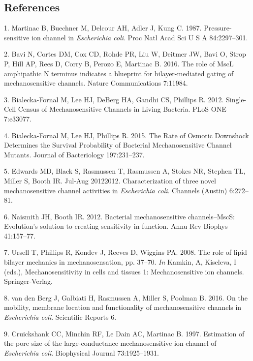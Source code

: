 \subsection*{References}\label{references}

\hypertarget{refs}{}
\hypertarget{ref-martinac1987}{}
1.
Martinac
B,
Buechner
M,
Delcour
AH,
Adler
J,
Kung
C.
1987.
Pressure-sensitive
ion
channel
in
\emph{Escherichia
coli}.
Proc
Natl
Acad
Sci U
S A
84:2297--301.

\hypertarget{ref-bavi2016}{}
2.
Bavi
N,
Cortes
DM,
Cox
CD,
Rohde
PR,
Liu W,
Deitmer
JW,
Bavi
O,
Strop
P,
Hill
AP,
Rees
D,
Corry
B,
Perozo
E,
Martinac
B.
2016.
The
role
of
MscL
amphipathic
N
terminus
indicates
a
blueprint
for
bilayer-mediated
gating
of
mechanosensitive
channels.
Nature
Communications
7:11984.

\hypertarget{ref-bialecka-fornal2012}{}
3.
Bialecka-Fornal
M, Lee
HJ,
DeBerg
HA,
Gandhi
CS,
Phillips
R.
2012.
Single-Cell
Census
of
Mechanosensitive
Channels
in
Living
Bacteria.
PLoS
ONE
7:e33077.

\hypertarget{ref-bialecka-fornal2015}{}
4.
Bialecka-Fornal
M, Lee
HJ,
Phillips
R.
2015.
The
Rate
of
Osmotic
Downshock
Determines
the
Survival
Probability
of
Bacterial
Mechanosensitive
Channel
Mutants.
Journal
of
Bacteriology
197:231--237.

\hypertarget{ref-edwards2012}{}
5.
Edwards
MD,
Black
S,
Rasmussen
T,
Rasmussen
A,
Stokes
NR,
Stephen
TL,
Miller
S,
Booth
IR.
Jul-Aug
20122012.
Characterization
of
three
novel
mechanosensitive
channel
activities
in
\emph{Escherichia
coli}.
Channels
(Austin)
6:272--81.

\hypertarget{ref-naismith2012}{}
6.
Naismith
JH,
Booth
IR.
2012.
Bacterial
mechanosensitive
channels--MscS:
Evolution's
solution
to
creating
sensitivity
in
function.
Annu
Rev
Biophys
41:157--77.

\hypertarget{ref-ursell2008}{}
7.
Ursell
T,
Phillips
R,
Kondev
J,
Reeves
D,
Wiggins
PA.
2008.
The
role
of
lipid
bilayer
mechanics
in
mechanosensation,
pp.
37--70.
\emph{In}
Kamkin,
A,
Kiseleva,
I
(eds.),
Mechanosensitivity
in
cells
and
tissues
1:
Mechanosensitive
ion
channels.
Springer-Verlag.

\hypertarget{ref-vandenberg2016}{}
8. van
den
Berg
J,
Galbiati
H,
Rasmussen
A,
Miller
S,
Poolman
B.
2016.
On the
mobility,
membrane
location
and
functionality
of
mechanosensitive
channels
in
\emph{Escherichia
coli}.
Scientific
Reports
6.

\hypertarget{ref-cruickshank1997}{}
9.
Cruickshank
CC,
Minchin
RF, Le
Dain
AC,
Martinac
B.
1997.
Estimation
of the
pore
size
of the
large-conductance
mechanosensitive
ion
channel
of
\emph{Escherichia
coli}.
Biophysical
Journal
73:1925--1931.

